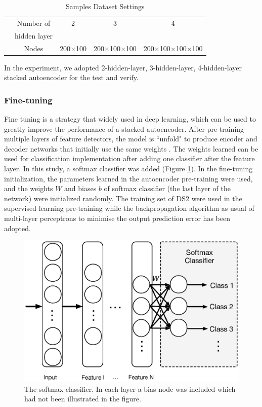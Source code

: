 \documentclass[journal]{IEEEtran}
\begin{document}
     
     \begin{table}[!htbp]
\begin{center}
\begin{threeparttable}
\caption{Samples Dataset Settings}
\label{Table 3}
\begin{tabular}{ccccc}
\hline
&Number of & 2 & 3 &  4\\
&hidden layer& & &\\
\hline
& Nodes & 200$\times$100 & 200$\times$100$\times$100&200$\times$100$\times$100$\times$100 \\

\hline
\end{tabular}
\end{threeparttable}
\end{center}
\end{table}


In the experiment, we adopted 2-hidden-layer, 3-hidden-layer, 4-hidden-layer stacked autoencoder for the test and verify. 

\subsubsection{Fine-tuning}
Fine tuning is a strategy that widely used in deep learning, which can be used to greatly improve the performance of a stacked autoencoder. 
After pre-training multiple layers of feature detectors, the model is ``unfold" to produce encoder and decoder networks that initially use the same weights \cite{hinton}. 
The weights learned can be used for classification implementation after adding one classifier after the feature layer. In this study, a softmax classifier was added (Figure \ref{figure3}). 
In the fine-tuning initialization, the parameters learned in the autoencoder pre-training were used, and the weights $W$ and biases $b$  of softmax classifier (the last layer of the network) were initialized randomly. 
The training set of DS2 were used in the supervised learning pre-training while the backpropagation algorithm as usual of multi-layer perceptrons to minimise the output prediction error has been adopted.

\begin{figure}[]
\centering
\includegraphics[width=3 in]{Figure3}
\caption{The softmax classifier. In each layer a bias node was included which had not been illustrated in the figure. }
\label{figure3}
\end{figure}
\end{document}
